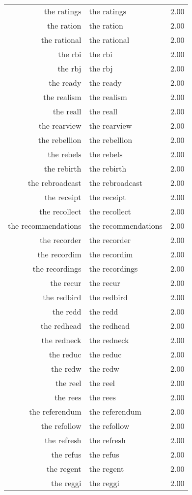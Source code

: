 \begin{table}[ht]
\begin{tabular}{rlr}
  the ratings & the ratings & 2.00 \\ 
  the ration & the ration & 2.00 \\ 
  the rational & the rational & 2.00 \\ 
  the rbi & the rbi & 2.00 \\ 
  the rbj & the rbj & 2.00 \\ 
  the ready & the ready & 2.00 \\ 
  the realism & the realism & 2.00 \\ 
  the reall & the reall & 2.00 \\ 
  the rearview & the rearview & 2.00 \\ 
  the rebellion & the rebellion & 2.00 \\ 
  the rebels & the rebels & 2.00 \\ 
  the rebirth & the rebirth & 2.00 \\ 
  the rebroadcast & the rebroadcast & 2.00 \\ 
  the receipt & the receipt & 2.00 \\ 
  the recollect & the recollect & 2.00 \\ 
  the recommendations & the recommendations & 2.00 \\ 
  the recorder & the recorder & 2.00 \\ 
  the recordim & the recordim & 2.00 \\ 
  the recordings & the recordings & 2.00 \\ 
  the recur & the recur & 2.00 \\ 
  the redbird & the redbird & 2.00 \\ 
  the redd & the redd & 2.00 \\ 
  the redhead & the redhead & 2.00 \\ 
  the redneck & the redneck & 2.00 \\ 
  the reduc & the reduc & 2.00 \\ 
  the redw & the redw & 2.00 \\ 
  the reel & the reel & 2.00 \\ 
  the rees & the rees & 2.00 \\ 
  the referendum & the referendum & 2.00 \\ 
  the refollow & the refollow & 2.00 \\ 
  the refresh & the refresh & 2.00 \\ 
  the refus & the refus & 2.00 \\ 
  the regent & the regent & 2.00 \\ 
  the reggi & the reggi & 2.00 \\ 

\end{tabular}
\end{table}
